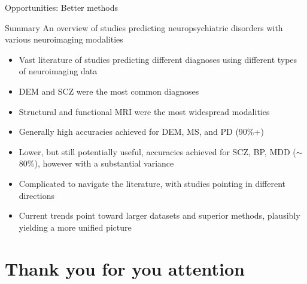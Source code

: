 \documentclass[10pt]{beamer}
\begin{document}
\begin{frame}{Opportunities: Better methods}
    \end{frame}
    \begin{frame}{Summary}
        \small{An overview of studies predicting neuropsychiatric disorders with various neuroimaging modalities}
        \begin{itemize}
            \item \footnotesize{Vast literature of studies predicting different diagnoses using different types of neuroimaging data}
            \item \footnotesize{DEM and SCZ were the most common diagnoses}
            \item \footnotesize{Structural and functional MRI were the most widespread modalities}
            \item \footnotesize{Generally high accuracies achieved for DEM, MS, and PD (90\%+)}
            \item \footnotesize{Lower, but still potentially useful, accuracies achieved for SCZ, BP, MDD ($\sim$80\%), however with a substantial variance}
            \item \footnotesize{Complicated to navigate the literature, with studies pointing in different directions}
            \item \footnotesize{Current trends point toward larger datasets and superior methods, plausibly yielding a more unified picture}
        \end{itemize}
    \end{frame}
    \section{Thank you for you attention}
\end{document}
